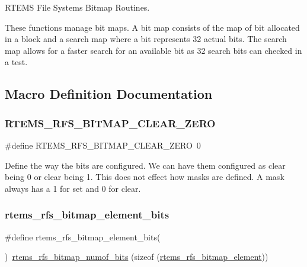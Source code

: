 R\+T\+E\+MS File Systems Bitmap Routines.

These functions manage bit maps. A bit map consists of the map of bit allocated in a block and a search map where a bit represents 32 actual bits. The search map allows for a faster search for an available bit as 32 search bits can checked in a test. 

\subsection{Macro Definition Documentation}
\mbox{\label{rtems-rfs-bitmaps_8h_ae2466cb8aeedf71a7f74bd8f64ff5c83}} 
\subsubsection{\texorpdfstring{RTEMS\_RFS\_BITMAP\_CLEAR\_ZERO}{RTEMS\_RFS\_BITMAP\_CLEAR\_ZERO}}
{\footnotesize\ttfamily \#define R\+T\+E\+M\+S\+\_\+\+R\+F\+S\+\_\+\+B\+I\+T\+M\+A\+P\+\_\+\+C\+L\+E\+A\+R\+\_\+\+Z\+E\+RO~0}

Define the way the bits are configured. We can have them configured as clear being 0 or clear being 1. This does not effect how masks are defined. A mask always has a 1 for set and 0 for clear. \mbox{\label{rtems-rfs-bitmaps_8h_a1a65e04003510b29a2fcb55e43940449}} 
\subsubsection{\texorpdfstring{rtems\_rfs\_bitmap\_element\_bits}{rtems\_rfs\_bitmap\_element\_bits}}
{\footnotesize\ttfamily \#define rtems\+\_\+rfs\+\_\+bitmap\+\_\+element\+\_\+bits(\begin{DoxyParamCaption}{ }\end{DoxyParamCaption})~\mbox{\hyperlink{rtems-rfs-bitmaps_8h_a789a8cd5be87a1954942fc26a9e928c0}{rtems\+\_\+rfs\+\_\+bitmap\+\_\+numof\+\_\+bits}} (sizeof (\mbox{\hyperlink{rtems-rfs-bitmaps_8h_a2e909e0a0c9759ac71ca69851253b905}{rtems\+\_\+rfs\+\_\+bitmap\+\_\+element}}))}

